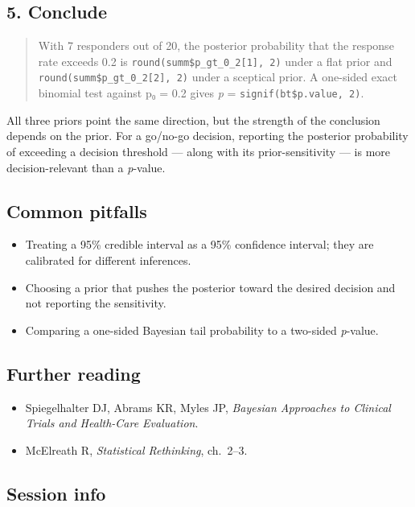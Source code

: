 \documentclass[
]{article}
\providecommand{\tightlist}{%
  \setlength{\itemsep}{0pt}\setlength{\parskip}{0pt}}
\begin{document}
\subsection{5. Conclude}\label{conclude}

\begin{quote}
With 7 responders out of 20, the posterior probability that the response
rate exceeds 0.2 is \texttt{round(summ\$p\_gt\_0\_2{[}1{]},\ 2)} under a
flat prior and \texttt{round(summ\$p\_gt\_0\_2{[}2{]},\ 2)} under a
sceptical prior. A one-sided exact binomial test against p₀ = 0.2 gives
\emph{p} = \texttt{signif(bt\$p.value,\ 2)}.
\end{quote}

All three priors point the same direction, but the strength of the
conclusion depends on the prior. For a go/no-go decision, reporting the
posterior probability of exceeding a decision threshold --- along with
its prior-sensitivity --- is more decision-relevant than a
\emph{p}-value.

\subsection{Common pitfalls}\label{common-pitfalls}

\begin{itemize}
\tightlist
\item
  Treating a 95\% credible interval as a 95\% confidence interval; they
  are calibrated for different inferences.
\item
  Choosing a prior that pushes the posterior toward the desired decision
  and not reporting the sensitivity.
\item
  Comparing a one-sided Bayesian tail probability to a two-sided
  \emph{p}-value.
\end{itemize}

\subsection{Further reading}\label{further-reading}

\begin{itemize}
\tightlist
\item
  Spiegelhalter DJ, Abrams KR, Myles JP, \emph{Bayesian Approaches to
  Clinical Trials and Health-Care Evaluation}.
\item
  McElreath R, \emph{Statistical Rethinking}, ch.~2--3.
\end{itemize}

\subsection{Session info}\label{session-info}
\end{document}
